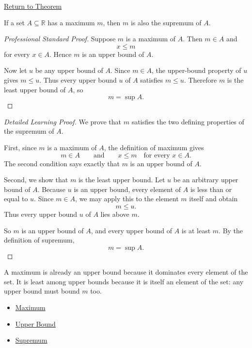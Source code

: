 \newpage
{}
\label{prf:maximum-implies-supremum}

\begin{remark*}[Return]
\hyperref[prop:maximum-implies-supremum]{Return to Theorem}
\end{remark*}


\begin{proposition*}
If a set $A \subseteq \mathbb{R}$ has a maximum $m$, then $m$ is also the supremum of $A$.
\end{proposition*}

\begin{proof}[Professional Standard Proof]
\LRAProofBodyStart
Suppose \(m\) is a maximum of \(A\). Then \(m\in A\) and
\[
x\le m
\]
for every \(x\in A\). Hence \(m\) is an upper bound of \(A\).

Now let \(u\) be any upper bound of \(A\). Since \(m\in A\), the upper-bound
property of \(u\) gives \(m\le u\). Thus every upper bound \(u\) of \(A\)
satisfies \(m\le u\). Therefore \(m\) is the least upper bound of \(A\), so
\[
m=\sup A.
\]
\end{proof}

\begin{proof}[Detailed Learning Proof]
\LRAProofBodyStart
We prove that \(m\) satisfies the two defining properties of the supremum of
\(A\).

First, since \(m\) is a maximum of \(A\), the definition of maximum gives
\[
m\in A
\qquad\text{and}\qquad
x\le m \quad\text{for every }x\in A.
\]
The second condition says exactly that \(m\) is an upper bound of \(A\).

Second, we show that \(m\) is the least upper bound. Let \(u\) be an arbitrary
upper bound of \(A\). Because \(u\) is an upper bound, every element of \(A\)
is less than or equal to \(u\). Since \(m\in A\), we may apply this to the
element \(m\) itself and obtain
\[
m\le u.
\]
Thus every upper bound \(u\) of \(A\) lies above \(m\).

So \(m\) is an upper bound of \(A\), and every upper bound of \(A\) is at least
\(m\). By the definition of supremum,
\[
m=\sup A.
\]
\end{proof}

\begin{remark*}
A maximum is already an upper bound because it dominates every element of the
set. It is least among upper bounds because it is itself an element of the set:
any upper bound must bound \(m\) too.
\end{remark*}

\begin{dependencies}
\begin{itemize}
  \item \hyperref[def:maximum]{Maximum}
  \item \hyperref[def:real-upper-bound]{Upper Bound}
  \item \hyperref[def:supremum]{Supremum}
\end{itemize}
\end{dependencies}

\clearpage

